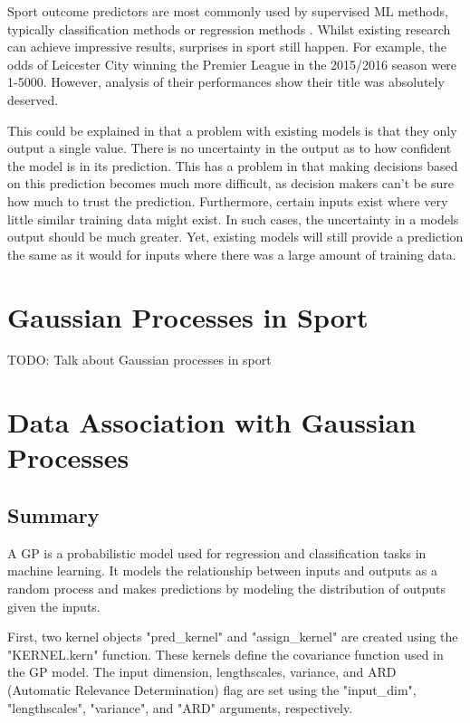 \documentclass[12pt,a4paper]{report}
\begin{document}
Sport outcome predictors are most commonly used by supervised ML methods, typically classification methods or regression methods \citep{horvat2020}. 
Whilst existing research can achieve impressive results, surprises in sport still happen. For example, the odds of Leicester City winning the Premier League in the 2015/2016 season were 1-5000. 
However, analysis of their performances show their title was absolutely deserved.

This could be explained in that a problem with existing models is that they only output a single value. 
There is no uncertainty in the output as to how confident the model is in its prediction. 
This has a problem in that making decisions based on this prediction becomes much more difficult, as decision makers can't be sure how much to trust the prediction. 
Furthermore, certain inputs exist where very little similar training data might exist. 
In such cases, the uncertainty in a models output should be much greater. 
Yet, existing models will still provide a prediction the same as it would for inputs where there was a large amount of training data.

\section{Gaussian Processes in Sport}

TODO: Talk about Gaussian processes in sport

\section{Data Association with Gaussian Processes}

\citep{Kaiser2018}
\citep{Lui2020}
\citep{Blumberg2020}

\subsection{Summary}

A GP is a probabilistic model used for regression and classification tasks in machine learning. 
It models the relationship between inputs and outputs as a random process and makes predictions by modeling the distribution of outputs given the inputs.

First, two kernel objects "pred\_kernel" and "assign\_kernel" are created using the "KERNEL.kern" function. 
These kernels define the covariance function used in the GP model. 
The input dimension, lengthscales, variance, and ARD (Automatic Relevance Determination) flag are set using the "input\_dim", "lengthscales", "variance", and "ARD" arguments, respectively.
\end{document}
